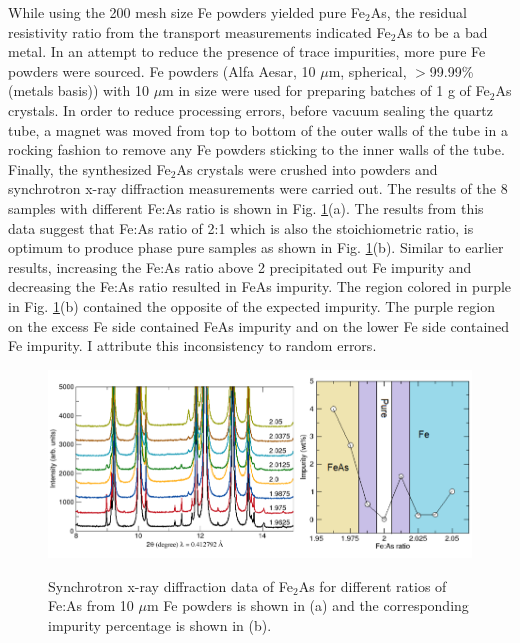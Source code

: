 \documentclass[10pt,doublespacing,edeposit]{uiucthesis2020}
\begin{document}
\begin{mainmatter}
While using the 200 mesh size Fe powders yielded pure Fe$_2$As, the residual resistivity ratio from the transport measurements indicated Fe$_2$As to be a bad metal. In an attempt to reduce the presence of trace impurities, more pure Fe powders were sourced. Fe powders (Alfa Aesar, 10 $\mu$m, spherical, $>$99.99\% (metals basis)) with 10 $\mu$m in size were used for preparing batches of 1 g of Fe$_2$As crystals. In order to reduce processing errors, before vacuum sealing the quartz tube, a magnet was moved from top to bottom of the outer walls of the tube in a rocking fashion to remove any Fe powders sticking to the inner walls of the tube. Finally, the synthesized Fe$_2$As crystals were crushed into powders and synchrotron x-ray diffraction measurements were carried out. The results of the 8 samples with different Fe:As ratio is shown in Fig. \ref{fig:Fe2As_ratio_2}(a). The results from this data suggest that Fe:As ratio of 2:1 which is also the stoichiometric ratio, is optimum to produce phase pure samples as shown in Fig. \ref{fig:Fe2As_ratio_2}(b). Similar to earlier results, increasing the Fe:As ratio above 2 precipitated out Fe impurity and decreasing the Fe:As ratio resulted in FeAs impurity. The region colored in purple in Fig. \ref{fig:Fe2As_ratio_2}(b) contained the opposite of the expected impurity. The purple region on the excess Fe side contained FeAs impurity and on the lower Fe side contained Fe impurity. I attribute this inconsistency to random errors.

\begin{figure}
\centering\includegraphics[width=\columnwidth]{figures/ch3/Fe2As_stoichiometry.png} \\
\caption{\label{fig:Fe2As_ratio_2}
Synchrotron x-ray diffraction data of Fe$_2$As for different ratios of Fe:As from 10 $\mu$m Fe powders is shown in (a) and the corresponding impurity percentage is shown in (b).
}
\end{figure}


\end{mainmatter}
\end{document}
